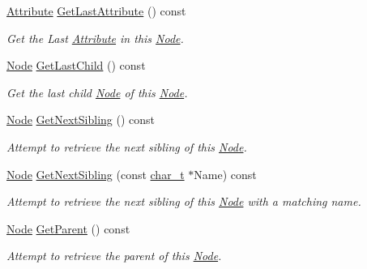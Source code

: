 \begin{DoxyCompactItemize}
\hyperlink{classMezzanine_1_1xml_1_1Attribute}{Attribute} \hyperlink{classMezzanine_1_1xml_1_1Node_a54a54c244bf5e3b844e64eee0e704c86}{GetLastAttribute} () const 
\begin{DoxyCompactList}\small\item\em Get the Last \hyperlink{classMezzanine_1_1xml_1_1Attribute}{Attribute} in this \hyperlink{classMezzanine_1_1xml_1_1Node}{Node}. \item\end{DoxyCompactList}\item 
\hyperlink{classMezzanine_1_1xml_1_1Node}{Node} \hyperlink{classMezzanine_1_1xml_1_1Node_a7b23c09b06898102858fd88c630231c9}{GetLastChild} () const 
\begin{DoxyCompactList}\small\item\em Get the last child \hyperlink{classMezzanine_1_1xml_1_1Node}{Node} of this \hyperlink{classMezzanine_1_1xml_1_1Node}{Node}. \item\end{DoxyCompactList}\item 
\hyperlink{classMezzanine_1_1xml_1_1Node}{Node} \hyperlink{classMezzanine_1_1xml_1_1Node_a91ecfa366dbb196052a813f96fb6eab4}{GetNextSibling} () const 
\begin{DoxyCompactList}\small\item\em Attempt to retrieve the next sibling of this \hyperlink{classMezzanine_1_1xml_1_1Node}{Node}. \item\end{DoxyCompactList}\item 
\hyperlink{classMezzanine_1_1xml_1_1Node}{Node} \hyperlink{classMezzanine_1_1xml_1_1Node_afff799135cac68889e91cacaf1f800a7}{GetNextSibling} (const \hyperlink{namespaceMezzanine_1_1xml_a29b8a47c179e9895c4e9e66c45d1dbbc}{char\_\-t} $\ast$Name) const 
\begin{DoxyCompactList}\small\item\em Attempt to retrieve the next sibling of this \hyperlink{classMezzanine_1_1xml_1_1Node}{Node} with a matching name. \item\end{DoxyCompactList}\item 
\hyperlink{classMezzanine_1_1xml_1_1Node}{Node} \hyperlink{classMezzanine_1_1xml_1_1Node_a49ed0fb3eee7cd4dfccdb72ad87bb210}{GetParent} () const 
\begin{DoxyCompactList}\small\item\em Attempt to retrieve the parent of this \hyperlink{classMezzanine_1_1xml_1_1Node}{Node}. \item\end{DoxyCompactList}\item 

\end{DoxyCompactItemize}

